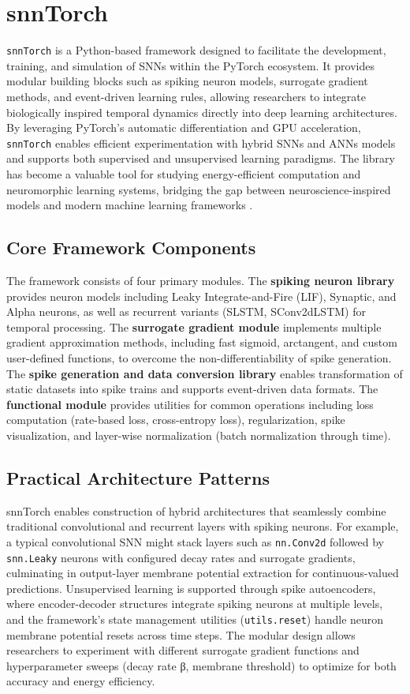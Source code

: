 \section{snnTorch}
\texttt{snnTorch} is a Python-based framework designed to facilitate the development, training, and simulation of SNNs within the PyTorch ecosystem. It provides modular building blocks such as spiking neuron models, surrogate gradient methods, and event-driven learning rules, allowing researchers to integrate biologically inspired temporal dynamics directly into deep learning architectures. By leveraging PyTorch's automatic differentiation and GPU acceleration, \texttt{snnTorch} enables efficient experimentation with hybrid SNNs and ANNs models and supports both supervised and unsupervised learning paradigms. The library has become a valuable tool for studying energy-efficient computation and neuromorphic learning systems, bridging the gap between neuroscience-inspired models and modern machine learning frameworks \cite{snntorch_docs}.

\subsection{Core Framework Components}
The framework consists of four primary modules. The \textbf{spiking neuron library} provides neuron models including Leaky Integrate-and-Fire (LIF), Synaptic, and Alpha neurons, as well as recurrent variants (SLSTM, SConv2dLSTM) for temporal processing. The \textbf{surrogate gradient module} implements multiple gradient approximation methods, including fast sigmoid, arctangent, and custom user-defined functions, to overcome the non-differentiability of spike generation. The \textbf{spike generation and data conversion library} enables transformation of static datasets into spike trains and supports event-driven data formats. The \textbf{functional module} provides utilities for common operations including loss computation (rate-based loss, cross-entropy loss), regularization, spike visualization, and layer-wise normalization (batch normalization through time).

\subsection{Practical Architecture Patterns} 
snnTorch enables construction of hybrid architectures that seamlessly combine traditional convolutional and recurrent layers with spiking neurons. For example, a typical convolutional SNN might stack layers such as \texttt{nn.Conv2d} followed by \texttt{snn.Leaky} neurons with configured decay rates and surrogate gradients, culminating in output-layer membrane potential extraction for continuous-valued predictions. Unsupervised learning is supported through spike autoencoders, where encoder-decoder structures integrate spiking neurons at multiple levels, and the framework's state management utilities (\texttt{utils.reset}) handle neuron membrane potential resets across time steps. The modular design allows researchers to experiment with different surrogate gradient functions and hyperparameter sweeps (decay rate 
β, membrane threshold) to optimize for both accuracy and energy efficiency.



